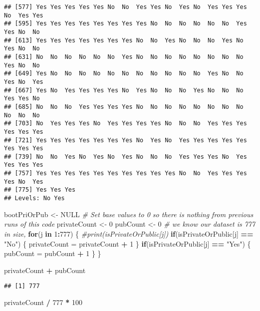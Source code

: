 \documentclass[
]{article}
\newenvironment{Shaded}{\begin{snugshade}}{\end{snugshade}}
\newcommand{\CommentTok}[1]{\textcolor[rgb]{0.56,0.35,0.01}{\textit{#1}}}
\newcommand{\ConstantTok}[1]{\textcolor[rgb]{0.56,0.35,0.01}{#1}}
\newcommand{\ControlFlowTok}[1]{\textcolor[rgb]{0.13,0.29,0.53}{\textbf{#1}}}
\newcommand{\DecValTok}[1]{\textcolor[rgb]{0.00,0.00,0.81}{#1}}
\newcommand{\NormalTok}[1]{#1}
\newcommand{\OtherTok}[1]{\textcolor[rgb]{0.56,0.35,0.01}{#1}}
\newcommand{\SpecialCharTok}[1]{\textcolor[rgb]{0.81,0.36,0.00}{\textbf{#1}}}
\newcommand{\StringTok}[1]{\textcolor[rgb]{0.31,0.60,0.02}{#1}}
\begin{document}
\begin{verbatim}
## [577] Yes Yes Yes Yes Yes No  No  Yes Yes No  Yes No  Yes Yes Yes No  Yes Yes
## [595] Yes Yes Yes Yes Yes Yes Yes Yes No  No  No  No  No  No  Yes Yes No  No 
## [613] Yes Yes Yes Yes Yes Yes Yes No  No  Yes No  No  No  Yes No  Yes No  No 
## [631] No  No  No  No  No  No  Yes No  No  No  No  No  No  No  No  Yes No  No 
## [649] Yes No  No  No  No  No  No  No  No  No  No  No  Yes No  No  Yes No  Yes
## [667] Yes No  Yes Yes Yes Yes No  Yes No  No  No  Yes No  No  No  Yes Yes No 
## [685] No  No  No  Yes Yes Yes Yes No  No  No  No  No  No  No  No  No  No  No 
## [703] No  Yes Yes Yes No  Yes Yes Yes Yes No  No  No  Yes Yes Yes Yes Yes Yes
## [721] Yes Yes Yes Yes Yes Yes Yes No  Yes No  Yes Yes Yes Yes Yes Yes Yes Yes
## [739] No  No  Yes No  Yes No  Yes No  No  No  Yes Yes Yes No  Yes Yes Yes Yes
## [757] Yes Yes Yes Yes Yes Yes Yes Yes Yes Yes No  No  Yes Yes Yes Yes No  Yes
## [775] Yes Yes Yes
## Levels: No Yes
\end{verbatim}

\begin{Shaded}
\begin{Highlighting}[]
\NormalTok{bootPriOrPub }\OtherTok{\textless{}{-}} \ConstantTok{NULL}
\CommentTok{\# Set base values to 0 so there is nothing from previous runs of this code}
\NormalTok{privateCount }\OtherTok{\textless{}{-}} \DecValTok{0}
\NormalTok{pubCount }\OtherTok{\textless{}{-}} \DecValTok{0}
\CommentTok{\# we know our dataset is 777 in size,}
\ControlFlowTok{for}\NormalTok{(j }\ControlFlowTok{in} \DecValTok{1}\SpecialCharTok{:}\DecValTok{777}\NormalTok{)}
\NormalTok{\{}
  \CommentTok{\#print(isPrivateOrPublic[j])}
  \ControlFlowTok{if}\NormalTok{(isPrivateOrPublic[j] }\SpecialCharTok{==} \StringTok{"No"}\NormalTok{)}
\NormalTok{  \{}
\NormalTok{    privateCount }\OtherTok{=}\NormalTok{ privateCount }\SpecialCharTok{+} \DecValTok{1} 
\NormalTok{  \}}
  \ControlFlowTok{if}\NormalTok{(isPrivateOrPublic[j] }\SpecialCharTok{==} \StringTok{"Yes"}\NormalTok{)}
\NormalTok{  \{}
\NormalTok{    pubCount }\OtherTok{=}\NormalTok{ pubCount }\SpecialCharTok{+} \DecValTok{1} 
\NormalTok{  \}}
\NormalTok{\}}

\NormalTok{privateCount }\SpecialCharTok{+}\NormalTok{ pubCount}
\end{Highlighting}
\end{Shaded}

\begin{verbatim}
## [1] 777
\end{verbatim}

\begin{Shaded}
\begin{Highlighting}[]
\NormalTok{privateCount }\SpecialCharTok{/} \DecValTok{777} \SpecialCharTok{*} \DecValTok{100}
\end{Highlighting}
\end{Shaded}
\end{document}
